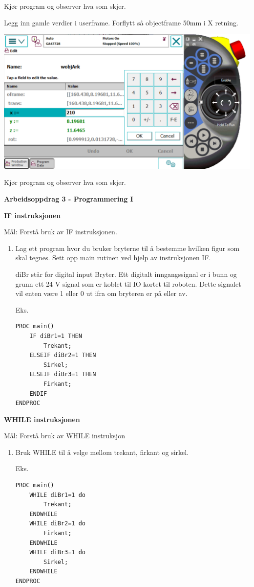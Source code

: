 Kjør program og observer hva som skjer. 

Legg inn gamle verdier i userframe. Forflytt så objectframe 50mm i
X retning. 

\includegraphics[width=1\textwidth]{i04861x36}

Kjør program og observer hva som skjer. 

\textbf{Arbeidsoppdrag 3 - Programmering I}

\textbf{IF instruksjonen}

Mål: Forstå bruk av IF instruksjonen.
\begin{enumerate}

\item Lag ett program hvor du bruker bryterne til å bestemme hvilken figur
som skal tegnes. Sett opp main rutinen ved hjelp av instruksjonen
IF.

diBr står for digital input Bryter. Ett digitalt inngangssignal er
i bunn og grunn ett 24 V signal som er koblet til IO kortet til roboten.
Dette signalet vil enten være 1 eller 0 ut ifra om bryteren er på
eller av.

Eks.
\begin{lstlisting}[basicstyle={\sffamily}]
PROC main()
	IF diBr1=1 THEN
		Trekant;
	ELSEIF diBr2=1 THEN
		Sirkel;
	ELSEIF diBr3=1 THEN
		Firkant;
	ENDIF
ENDPROC
\end{lstlisting}

\end{enumerate}

\textbf{WHILE instruksjonen}

Mål: Forstå bruk av WHILE instruksjon
\begin{enumerate}
\item Bruk WHILE til å velge mellom trekant, firkant og sirkel.

Eks.
\begin{lstlisting}[basicstyle={\sffamily}]
PROC main()
	WHILE diBr1=1 do
		Trekant;
	ENDWHILE
	WHILE diBr2=1 do
		Firkant;
	ENDWHILE
	WHILE diBr3=1 do
		Sirkel;
	ENDWHILE  
ENDPROC
\end{lstlisting}

\end{enumerate}

